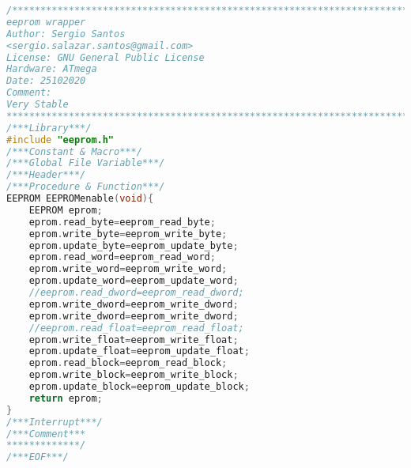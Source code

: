 \begin{lstlisting}[language=C, caption={eeprom.c}, label=eeprom-c, captionpos=b]
/*************************************************************************
eeprom wrapper
Author: Sergio Santos
<sergio.salazar.santos@gmail.com>
License: GNU General Public License
Hardware: ATmega
Date: 25102020
Comment:
Very Stable
*************************************************************************/
/***Library***/
#include "eeprom.h"
/***Constant & Macro***/
/***Global File Variable***/
/***Header***/
/***Procedure & Function***/
EEPROM EEPROMenable(void){
	EEPROM eprom;
	eprom.read_byte=eeprom_read_byte;
	eprom.write_byte=eeprom_write_byte;
	eprom.update_byte=eeprom_update_byte;
	eprom.read_word=eeprom_read_word;
	eprom.write_word=eeprom_write_word;
	eprom.update_word=eeprom_update_word;
	//eeprom.read_dword=eeprom_read_dword;
	eprom.write_dword=eeprom_write_dword;
	eprom.write_dword=eeprom_write_dword;
	//eeprom.read_float=eeprom_read_float;
	eprom.write_float=eeprom_write_float;
	eprom.update_float=eeprom_update_float;
	eprom.read_block=eeprom_read_block;
	eprom.write_block=eeprom_write_block;
	eprom.update_block=eeprom_update_block;
	return eprom;
}
/***Interrupt***/
/***Comment***
*************/
/***EOF***/
\end{lstlisting}
